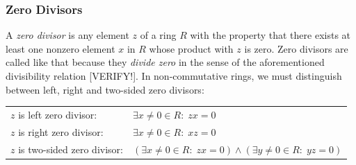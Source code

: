 



\subsubsection{Zero Divisors}
A \emph{zero divisor} is any element $z$ of a ring $R$ with the property that there exists at least one nonzero element $x$ in $R$ whose product with $z$ is zero. Zero divisors are called like that because they \emph{divide zero} in the sense of the aforementioned divisibility relation [VERIFY!]. In non-commutative rings, we must distinguish between left, right and two-sided zero divisors:

\medskip
\begin{tabular}{l l}
$z$ is left zero divisor:       & $ \exists x \neq 0 \in R: \; z x = 0$  \\
$z$ is right zero divisor:      & $ \exists x \neq 0 \in R: \; x z = 0$  \\
$z$ is two-sided zero divisor:  & $(\exists x \neq 0 \in R: \; z x = 0) 
                            \wedge (\exists y \neq 0 \in R: \; y z = 0)$  \\
\end{tabular}
\medskip

